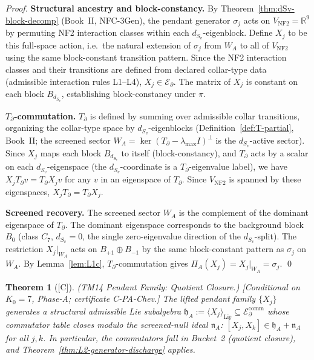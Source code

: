 \documentclass[12pt,oneside]{amsbook}
\theoremstyle{plain}
\newtheorem{theorem}{Theorem}[section]
\theoremstyle{definition}
\theoremstyle{remark}
\newcommand{\status}[1]{\textup{[#1]}}
\begin{document}
\begin{proof}
\textbf{Structural ancestry and block-constancy.}
By Theorem~\ref{thm:dSv-block-decomp} (Book~II, NFC-3Gen), the
pendant generator $\sigma_j$ acts on $V_{\mathrm{NF2}} = \mathbb{R}^9$
by permuting NF2 interaction classes within each
$d_{S_v}$-eigenblock. Define $X_j$ to be this full-space action,
i.e.\ the natural extension of $\sigma_j$ from $W_A$ to all of
$V_{\mathrm{NF2}}$ using the same block-constant transition pattern.
Since the NF2 interaction classes and their transitions are defined
from declared collar-type data (admissible interaction rules L1--L4),
$X_j \in \mathcal{E}_\partial$. The matrix of $X_j$ is constant on
each block $B_{d_{S_v}}$, establishing block-constancy under $\pi$.

\textbf{$T_\partial$-commutation.}
$T_\partial$ is defined by summing over admissible collar transitions,
organizing the collar-type space by $d_{S_v}$-eigenblocks
(Definition~\ref{def:T-partial}, Book~II; the screened sector
$W_A = \ker(T_\partial - \lambda_{\max}I)^\perp$ is the
$d_{S_v}$-active sector). Since $X_j$ maps each block $B_{d_{S_v}}$
to itself (block-constancy), and $T_\partial$ acts by a scalar on
each $d_{S_v}$-eigenspace (the $d_{S_v}$-coordinate is a
$T_\partial$-eigenvalue label), we have $X_j T_\partial v =
T_\partial X_j v$ for any $v$ in an eigenspace of $T_\partial$.
Since $V_{\mathrm{NF2}}$ is spanned by these eigenspaces,
$X_j T_\partial = T_\partial X_j$.

\textbf{Screened recovery.}
The screened sector $W_A$ is the complement of the dominant eigenspace
of $T_\partial$. The dominant eigenspace corresponds to the
background block $B_0$ (class $C_7$, $d_{S_v}=0$, the single
zero-eigenvalue direction of the $d_{S_v}$-split). The restriction
$X_j|_{W_A}$ acts on $B_{+1} \oplus B_{-1}$ by the same
block-constant pattern as $\sigma_j$ on $W_A$. By
Lemma~\ref{lem:L1c}, $T_\partial$-commutation gives
$\Pi_A(X_j) = X_j|_{W_A} = \sigma_j$. \qed
\end{proof}

\begin{theorem}[\status{C}]\label{thm:S1b-closure}
\textup{(TM14 Pendant Family: Quotient Closure.)}
\textup{[Conditional on $K_0=7$, Phase-A; certificate C-PA-Chev.]}
The lifted pendant family $\{X_j\}$ generates a structural admissible
Lie subalgebra $\mathfrak{h}_A := \langle X_j \rangle_{\mathrm{Lie}}
\subseteq \mathcal{E}_\partial^{\mathrm{comm}}$ whose commutator table
closes modulo the screened-null ideal $\mathfrak{n}_A$:
$[X_j, X_k] \in \mathfrak{h}_A + \mathfrak{n}_A$ for all $j,k$.
In particular, the commutators fall in Bucket~2 (quotient closure),
and Theorem~\ref{thm:L2-generator-discharge} applies.
\end{theorem}
\end{document}

